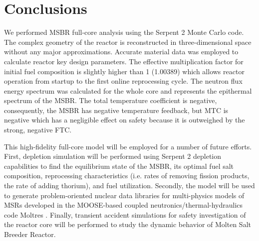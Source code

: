 \documentclass{anstrans}
\begin{document}
\section{Conclusions}
We performed \gls{MSBR} full-core analysis using the Serpent 2 Monte Carlo 
code. The complex geometry of the reactor is reconstructed in three-dimensional 
space without any major approximations. Accurate material data was employed to 
calculate reactor key design parameters. The effective multiplication factor 
for initial fuel composition is slightly higher than 1 (1.00389) which allows 
reactor operation from startup to the first online reprocessing cycle. The 
neutron flux energy spectrum was calculated for the whole core and represents 
the epithermal spectrum of the MSBR. The total temperature coefficient is 
negative, consequently, the MSBR has negative temperature feedback, but MTC is 
negative which has a negligible effect on safety because it is outweighed by 
the strong, negative FTC.

This high-fidelity full-core model will be employed for a number of future 
efforts. First, depletion simulation will be performed using Serpent 2 
depletion capabilities to find the equilibrium state of the MSBR, its optimal 
fuel salt composition, reprocessing characteristics (i.e. rates of removing 
fission products, the rate of adding thorium), and fuel utilization. Secondly, 
the model will be used to generate problem-oriented nuclear data libraries for 
multi-physics models of \glspl{MSR} developed in the MOOSE-based coupled 
neutronics/thermal-hydraulics code Moltres \cite{lindsay_arfc/moltres:_2017}.  
Finally, transient accident simulations for safety investigation of the reactor 
core will be performed to study the dynamic behavior of Molten Salt Breeder 
Reactor. 




\end{document}
